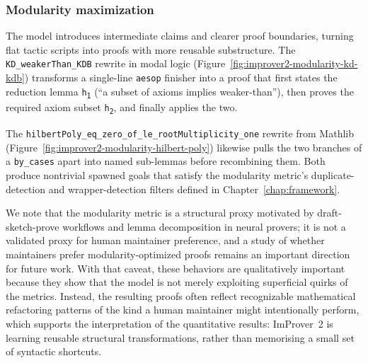 \subsubsection{Modularity maximization}

The model introduces intermediate claims and clearer proof boundaries, turning flat tactic scripts into proofs with more reusable substructure. The \texttt{KD\_weakerThan\_KDB} rewrite in modal logic (Figure~\ref{fig:improver2-modularity-kd-kdb}) transforms a single-line \texttt{aesop} finisher into a proof that first states the reduction lemma \texttt{h\textsubscript{1}} (``a subset of axioms implies weaker-than''), then proves the required axiom subset \texttt{h\textsubscript{2}}, and finally applies the two. 

The \texttt{hilbertPoly\_eq\_zero\_of\_le\_rootMultiplicity\_one} rewrite from Mathlib (Figure~\ref{fig:improver2-modularity-hilbert-poly}) likewise pulls the two branches of a \texttt{by\_cases} apart into named sub-lemmas before recombining them. Both produce nontrivial spawned goals that satisfy the modularity metric's duplicate-detection and wrapper-detection filters defined in Chapter~\ref{chap:framework}.

We note that the modularity metric is a structural proxy motivated by draft-sketch-prove workflows and lemma decomposition in neural provers; it is not a validated proxy for human maintainer preference, and a study of whether maintainers prefer modularity-optimized proofs remains an important direction for future work. With that caveat, these behaviors are qualitatively important because they show that the model is not merely exploiting superficial quirks of the metrics. Instead, the resulting proofs often reflect recognizable mathematical refactoring patterns of the kind a human maintainer might intentionally perform, which supports the interpretation of the quantitative results: ImProver~2 is learning reusable structural transformations, rather than memorising a small set of syntactic shortcuts.




